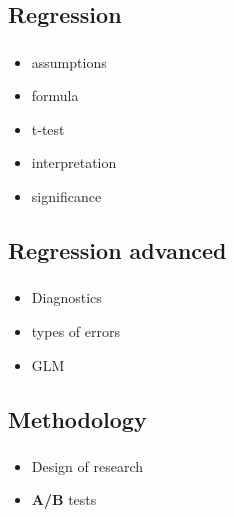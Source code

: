 \documentclass[t, 11pt]{beamer}
\begin{document}
	\subsection{Regression}
	\begin{frame}\label{}
		\frametitle{\insertsection}
		\frametitle{\insertsubsection}
		
		\begin{itemize}
			\item assumptions 
			\item formula 
			\item t-test
			\item interpretation
			\item significance
		\end{itemize}	  
	\end{frame}			
	
	\subsection{Regression advanced}
	\begin{frame}\label{}
		\frametitle{\insertsection}
		\frametitle{\insertsubsection}
		
		\begin{itemize}
			\item Diagnostics 
			\item types of errors 
			\item GLM
		\end{itemize}	  
	\end{frame}			
	
	\subsection{Methodology}
	\begin{frame}\label{}
		\frametitle{\insertsection}
		\frametitle{\insertsubsection}
		
		\begin{itemize}
			\item Design  of research 
			\item \textbf{A\slash B} tests
		\end{itemize}	  
		
	\end{frame}			
	
	
\end{document}
